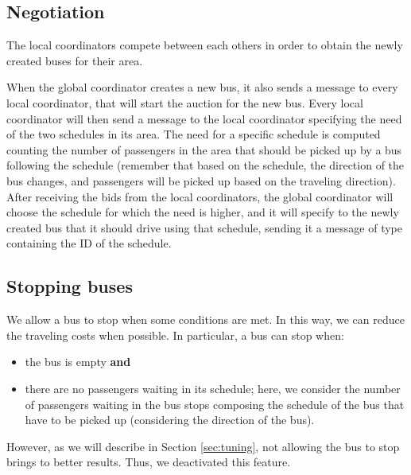 \subsection{Negotiation}
\label{subsec:negotiations}

The local coordinators compete between each others in order to obtain the newly created buses for their area.

When the global coordinator creates a new bus, it also sends a message  to every local coordinator, that will start the auction for the new bus. Every local coordinator will then send a message  to the local coordinator specifying the need of the two schedules in its area. The need for a specific schedule is computed counting the number of passengers in the area that should be picked up by a bus following the schedule (remember that based on the schedule, the direction of the bus changes, and passengers will be picked up based on the traveling direction). After receiving the bids from the local coordinators, the global coordinator will choose the schedule for which the need is higher, and it will specify to the newly created bus that it should drive using that schedule, sending it a message of type  containing the ID of the schedule.

\subsection{Stopping buses}
\label{sec:stop}

We allow a bus to stop when some conditions are met. In this way, we can reduce the traveling costs when possible. In particular, a bus can stop when:

\begin{itemize}
\item the bus is empty \textbf{and}
\item there are no passengers waiting in its schedule; here, we consider the number of passengers waiting in the bus stops composing the schedule of the bus that have to be picked up (considering the direction of the bus).
\end{itemize}

However, as we will describe in Section \ref{sec:tuning}, not allowing the bus to stop brings to better results. Thus, we deactivated this feature.
